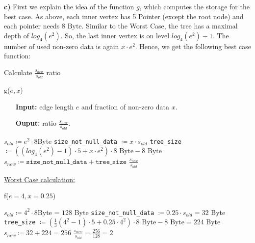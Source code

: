 \documentclass[english, fontsize=12pt, paper=a4, twoside=false, draft=true, pagesize=auto, version=last, DIV=16]{scrartcl}
\theoremstyle{break}
\begin{document}
\textbf{c)}
First we explain the idea of the function $g$, which computes the storage for the best case. As above, each inner vertex has 5 Pointer (except the root node) and each pointer needs $8 \text{ Byte}$. Similar to the Worst Case, the tree has a maximal depth of $log_4(e^2)$. So, the last inner vertex is on level $log_4(e^2) - 1$. The number of used non-zero data is again $x \cdot e^2$. Hence, we get the following best case function: \par
\newpage
\begin{algorithm}
\caption{Calculate $\frac{s_{new}}{s_{old}}$ ratio}
\label{Alg f} \par
\medskip
{g($e, x$)} \par
\vspace*{-3mm}
\begin{itemize}[leftmargin=20mm]
\item[\textbf{Input:}] edge length $e$ and fraction of non-zero data $x$. \\[-20pt]
\item[\textbf{Ouput:}] ratio $\frac{s_{new}}{s_{old}}$.
\end{itemize} \par
\vspace*{-3mm}
\begin{algorithmic}[1]
	\State $s_{old} \coloneqq e^2 \cdot 8$Byte
	\State \texttt{size\_not\_null\_data} $\coloneqq x \cdot s_{old}$
	\State \texttt{tree\_size} $\coloneqq \left( (log_4(e^2) - 1) \cdot 5 + x \cdot e^2 \right) \cdot 8 \text{ Byte} - 8 \text{ Byte}$
	\State $s_{new} \coloneqq \texttt{size\_not\_null\_data} + \texttt{tree\_size}$ 
   	\State \Return $\frac{s_{new}}{s_{old}}$
\end{algorithmic}
\end{algorithm}\par
\vspace*{5mm}

\underline{Worst Case calculation:} \par
\vspace*{-3mm}
\begin{algorithm}
{f($e=4, x=0.25$)} \par
\begin{algorithmic}[1]
	\State $s_{old} \coloneqq 4^2 \cdot 8$Byte = $128$ Byte
	\State \texttt{size\_not\_null\_data} $\coloneqq 0.25 \cdot s_{old} = 32$ Byte
	\State \texttt{tree\_size} $\coloneqq \left(\frac{1}{3}\left( 4^2 - 1 \right) \cdot 5 + 0.25 \cdot 4^2 \right) \cdot 8 \text{ Byte} - 8 \text{ Byte} = 224$ Byte
	\State $s_{new} \coloneqq 32 + 224 = 256$ 
   	\State \Return $\frac{s_{new}}{s_{old}} = \frac{256}{128} = 2$
\end{algorithmic}
\end{algorithm}\par
\vspace*{3mm}
\end{document}
